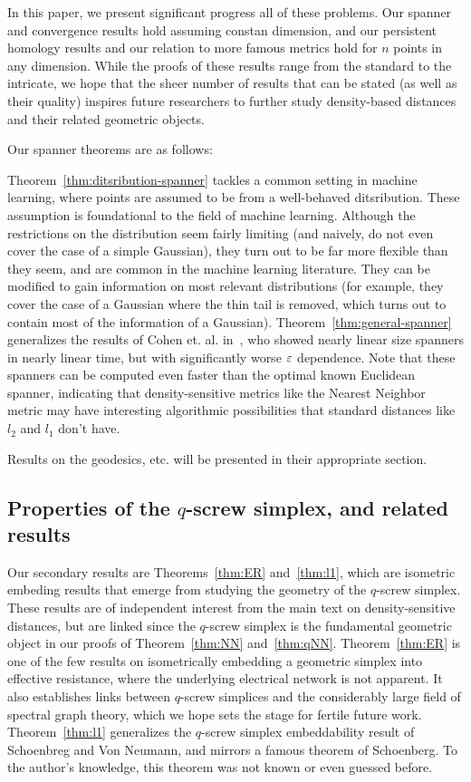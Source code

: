In this paper, we present significant progress all of these problems. Our
spanner and convergence results hold assuming constan dimension, and our
persistent homology results and our relation to more famous metrics hold for
$n$ points in any dimension. While the proofs of these results range from
the standard to the intricate, we hope that the sheer number of results
that can be stated (as well as their quality) inspires future researchers
to further study density-based distances and their related geometric objects.

Our spanner theorems are as follows:

 

Theorem~\ref{thm:ditsribution-spanner} tackles a common setting in machine
learning, where points are assumed to be from a well-behaved ditsribution.
These assumption is foundational to the field of machine learning.
Although the restrictions on the distribution seem fairly limiting (and
naively, do not even cover the case of a simple Gaussian), they turn out to
be far more flexible than they seem, and are common in the machine learning
literature. They can be modified to gain information on most relevant
distributions (for example, they cover the
case of a Gaussian where the thin tail is removed, which turns out to
contain most of the information of a Gaussian).
Theorem~\ref{thm:general-spanner} generalizes the results of Cohen et. al.
in~\cite{cohen15approximating}, who showed nearly linear size spanners in
nearly linear time, but with significantly worse $\varepsilon$ dependence. Note
that these spanners can be computed even faster than the optimal known
Euclidean spanner, indicating that density-sensitive metrics like the
Nearest Neighbor metric may have interesting algorithmic possibilities that
standard distances like $l_2$ and $l_1$ don't have.

Results on the geodesics, etc. will be presented in their appropriate
section.

\subsection{Properties of the $q$-screw simplex, and related results}
Our secondary results are Theorems~\ref{thm:ER} and~\ref{thm:l1}, which are
isometric embeding results that emerge from studying the geometry of the
$q$-screw simplex.  These results are of independent interest from the main
text on density-sensitive distances, but are linked since the $q$-screw
simplex is the fundamental geometric object in our proofs of
Theorem~\ref{thm:NN} and~\ref{thm:qNN}.
Theorem~\ref{thm:ER} is one of the few results on isometrically embedding a
geometric simplex into effective resistance, where the underlying
electrical network is not apparent. It also establishes links between
$q$-screw simplices and the considerably large field of spectral graph theory,
which we hope sets the stage for fertile future work.
Theorem~\ref{thm:l1} generalizes the $q$-screw simplex embeddability result
of Schoenbreg and Von Neumann, and mirrors a famous theorem of Schoenberg.
To the author's knowledge, this theorem was not known or even guessed
before.
